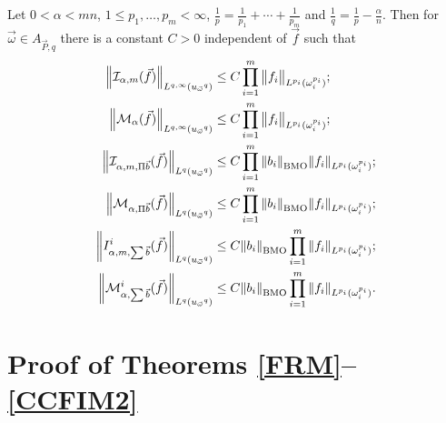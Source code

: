 \documentclass[11pt, twoside, leqno]{article}
\begin{document}
\begin{lem}\label{LB2}
	Let $0 < \alpha < mn$, $1 \leqslant p_1, \ldots, p_m < \infty$,
	$\frac{1}{p} = \frac{1}{p_1} + \cdots + \frac{1}{p_m}$ and
	$\frac{1}{q} = \frac{1}{p} - \frac{\alpha}{n}$. Then for
	$\vec{\omega}\in A_{\vec{P}, q}$ there is a constant $C > 0$
	independent of $\vec{f}$ such that
	\begin{align}
	{\left\|\mathcal{I}_{\alpha,m}(\vec{f})\right\|}_{L^{q,\infty}({u_{\vec{\omega}}}^{q})} &\le C \prod_{i =1}^m{\big\|f_i\big\|}_{L^{p_i}(\omega_i^{p_i})};\notag\\
	{\left\|\mathcal{M}_{\alpha}(\vec{f})\right\|}_{L^{q,\infty}({u_{\vec{\omega}}}^{q})} &\le C \prod_{i =1}^m{\big\|f_i\big\|}_{L^{p_i}(\omega_i^{p_i})};\notag\\
	{\left\| {{\mathcal{I}_{\alpha ,m,\Pi \vec b}}(\vec f)} \right\|_{{L^q}({u_{\vec \omega }}^q)}} &\le C\prod\limits_{i = 1}^m {{{\left\| {{b_i}} \right\|}_{\rm BMO}}{{\left\| {{f_i}} \right\|}_{{L^{{p_i}}}(\omega _i^{{p_i}})}}};\notag\\
	{\left\| {{\mathcal{M}_{\alpha ,\Pi \vec b}}(\vec f)} \right\|_{{L^q}({u_{\vec \omega }}^q)}} &\le C\prod\limits_{i = 1}^m {{{\left\| {{b_i}} \right\|}_{\rm BMO}}{{\left\| {{f_i}} \right\|}_{{L^{{p_i}}}(\omega _i^{{p_i}})}}};\notag\\
	{\left\| {I_{\alpha,m,\sum {\vec b} }^i(\vec f)} \right\|_{{L^q}({u_{\vec \omega }}^q)}}&\le C{\left\| {{b_i}} \right\|_{\rm BMO}}\prod\limits_{i = 1}^m {{{\left\| {{f_i}} \right\|}_{{L^{{p_i}}}(\omega _i^{{p_i}})}}};\notag\\
	{\left\| {\mathcal{M}_{\alpha ,\sum {\vec b} }^i(\vec f)} \right\|_{{L^q}({u_{\vec \omega }}^q)}} &\le C{\left\| {{b_i}} \right\|_{\rm BMO}}\prod\limits_{i = 1}^m {{{\left\| {{f_i}} \right\|}_{{L^{{p_i}}}(\omega _i^{{p_i}})}}}.
	\end{align}
\end{lem}


\section{Proof of Theorems \ref{FRM}--\ref{CCFIM2}}\label{sec3}
\end{document}
